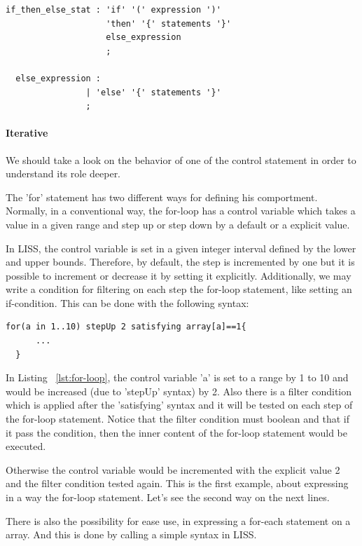 \documentclass[
  oneside,
  11pt, a4paper,
  footinclude=true,
  headinclude=true,
  cleardoublepage=empty
]{scrbook}
\begin{document}
\begin{lstlisting}[caption={BNF of iterative statement in LISS},label={lst:if_bnf}]
  if_then_else_stat : 'if' '(' expression ')'
                    'then' '{' statements '}'
                    else_expression
                    ;

  else_expression :
                | 'else' '{' statements '}'
                ;
\end{lstlisting}

\paragraph{Iterative}

We should take a look on the behavior of one of the control statement in order to understand its role deeper.

The 'for' statement has two different ways for defining his comportment.
Normally, in a conventional way, the for-loop has a control variable which takes a value in a given range and step up or step down by a default or a explicit value.

In LISS, the control variable is set in a given integer interval defined by the lower and upper bounds. Therefore, by default, the step is incremented by one but it is possible to increment or decrease it by setting it explicitly.
Additionally, we may write a condition for filtering on each step the for-loop statement, like setting an if-condition.
This can be done with the following syntax:
\begin{lstlisting}[caption={LISS syntax of a for-loop statement},label={lst:for-loop}]
  for(a in 1..10) stepUp 2 satisfying array[a]==1{
	  ...
  }
\end{lstlisting}
In Listing ~\ref{lst:for-loop}, the control variable 'a' is set to a range by 1 to 10 and would be increased (due to 'stepUp' syntax) by 2. Also there is a filter condition which is applied after the 'satisfying' syntax and it will be tested on each step of the for-loop statement. Notice that the filter condition must boolean and that if it pass the condition, then the inner content of the for-loop statement would be executed. 

Otherwise the control variable would be incremented with the explicit value 2 and the filter condition tested again. 
This is the first example, about expressing in a way the for-loop statement. Let's see the second way on the next lines.

There is also the possibility for ease use, in expressing a for-each statement on a array.
And this is done by calling a simple syntax in LISS.
\end{document}

